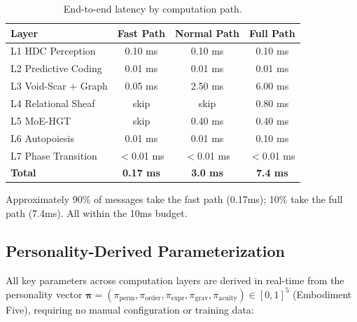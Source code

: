 \documentclass[11pt]{article}
\begin{document}
\begin{table}[h]
\centering
\caption{End-to-end latency by computation path.}
\label{tab:perf}
\begin{tabular}{lccc}
\toprule
Layer & Fast Path & Normal Path & Full Path \\
\midrule
L1 HDC Perception & 0.10 ms & 0.10 ms & 0.10 ms \\
L2 Predictive Coding & 0.01 ms & 0.01 ms & 0.01 ms \\
L3 Void-Scar + Graph & 0.05 ms & 2.50 ms & 6.00 ms \\
L4 Relational Sheaf & skip & skip & 0.80 ms \\
L5 MoE-HGT & skip & 0.40 ms & 0.40 ms \\
L6 Autopoiesis & 0.01 ms & 0.01 ms & 0.10 ms \\
L7 Phase Transition & $<$0.01 ms & $<$0.01 ms & $<$0.01 ms \\
\midrule
\textbf{Total} & \textbf{0.17 ms} & \textbf{3.0 ms} & \textbf{7.4 ms} \\
\bottomrule
\end{tabular}
\end{table}

Approximately 90\% of messages take the fast path (0.17ms); 10\% take the full path (7.4ms). All within the 10ms budget.

\subsection{Personality-Derived Parameterization}

All key parameters across computation layers are derived in real-time from the personality vector $\boldsymbol{\pi} = (\pi_{\text{perm}}, \pi_{\text{order}}, \pi_{\text{expr}}, \pi_{\text{grav}}, \pi_{\text{acuity}}) \in [0,1]^5$ (Embodiment Five), requiring no manual configuration or training data:
\end{document}
